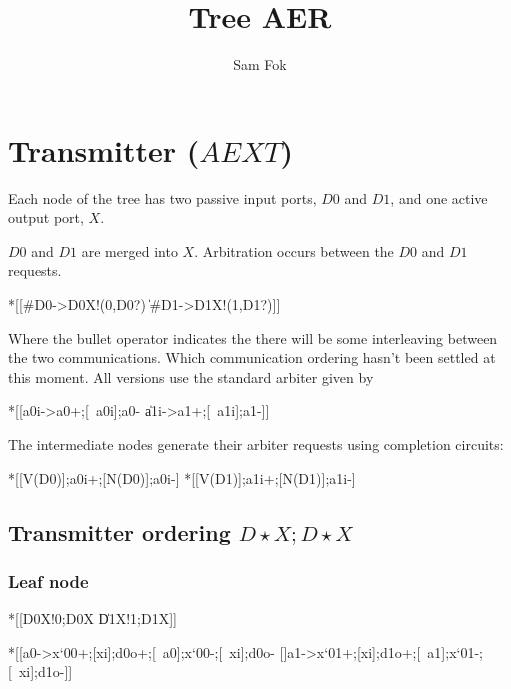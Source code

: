 \documentclass{article}
\begin{document}
\title{Tree AER}
\author{Sam Fok}
\maketitle

\section{Transmitter ($AEXT$)}

Each node of the tree has two passive input ports, $D0$ and $D1$, and one active output port, $X$.

$D0$ and $D1$ are merged into $X$. Arbitration occurs between the $D0$ and $D1$ requests. 

\begin{csp}
*[[#{D0}->D0\*X!(0,D0?)
  \|#{D1}->D1\*X!(1,D1?)]]
\end{csp}

Where the bullet operator indicates the there will be some interleaving between the two communications. Which communication ordering hasn't been settled at this moment. All versions use the standard arbiter given by

\begin{hse}
*[[a0i->a0+;[~a0i];a0-
  \|a1i->a1+;[~a1i];a1-]]
\end{hse}

The intermediate nodes generate their arbiter requests using completion circuits:

\begin{hse}
*[[V(D0)];a0i+;[N(D0)];a0i-]
*[[V(D1)];a1i+;[N(D1)];a1i-]
\end{hse}

\subsection{Transmitter ordering $D\!\star\!X;D\!\star\!X$}

\subsubsection{Leaf node}

\begin{csp}
*[[D0\star\!X!0;D0\star\!X
  \|D1\star\!X!1;D1\star\!X]]
\end{csp}

\begin{hse}
*[[a0->x`{00}+;[xi];d0o+;[~a0];x`{00}-;[~xi];d0o-
  []a1->x`{01}+;[xi];d1o+;[~a1];x`{01}-;[~xi];d1o-]]
\end{hse}
\end{document}
